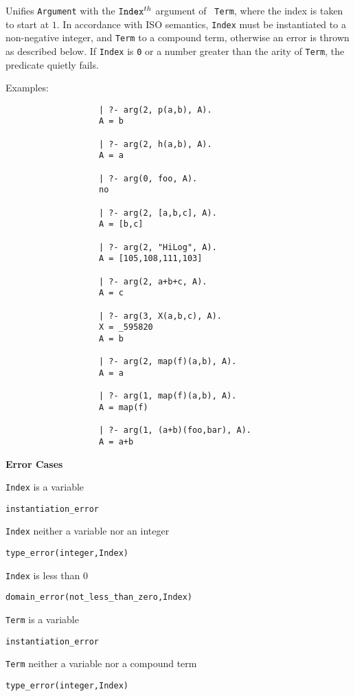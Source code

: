 \begin{description}
 Unifies
        {\tt Argument} with the ${\tt Index}^{th}$ argument of {\tt
          Term}\@, where the index is taken to start at $1$.  In
        accordance with ISO semantics, {\tt Index} must be
        instantiated to a non-negative integer, and {\tt Term} to a
        compound term, otherwise an error is thrown as described
        below.  If {\tt Index} is {\tt 0} or a number greater than the
        arity of {\tt Term}, the predicate quietly fails.    

    Examples:
    {\footnotesize
     \begin{verbatim}
                   | ?- arg(2, p(a,b), A).
                   A = b

                   | ?- arg(2, h(a,b), A).
                   A = a

                   | ?- arg(0, foo, A).
                   no

                   | ?- arg(2, [a,b,c], A).
                   A = [b,c]

                   | ?- arg(2, "HiLog", A).
                   A = [105,108,111,103]

                   | ?- arg(2, a+b+c, A).
                   A = c

                   | ?- arg(3, X(a,b,c), A).
                   X = _595820 
                   A = b 

                   | ?- arg(2, map(f)(a,b), A).
                   A = a

                   | ?- arg(1, map(f)(a,b), A). 
                   A = map(f)

                   | ?- arg(1, (a+b)(foo,bar), A).
                   A = a+b
     \end{verbatim}}

{\bf Error Cases} 
\bi
\item 	{\tt Index} is a variable
\bi
\item    {\tt instantiation\_error}
\ei
\item 	{\tt Index} neither a variable nor an integer
\bi
\item    {\tt type\_error(integer,Index)}
\ei
\item 	{\tt Index} is less than 0
\bi
\item    {\tt domain\_error(not\_less\_than\_zero,Index)}
\ei
\item 	{\tt Term} is a variable
\bi
\item    {\tt instantiation\_error}
\ei
\item 	{\tt Term} neither a variable nor a compound term
\bi
\item    {\tt type\_error(integer,Index)}
\ei
\ei


\end{description}
